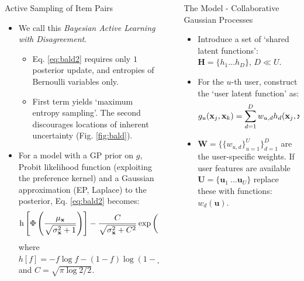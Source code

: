 \documentclass[final]{beamer}
\newlength{\sepwid}
\newlength{\onecolwid}
\newcommand{\x}{\mathbf{x}}
\begin{document}
\begin{frame}[t]
\begin{columns}[t]
\begin{column}{\onecolwid}
\begin{block}{Active Sampling of Item Pairs}
\begin{itemize}
\begin{align}
          \end{align}
        \item We call this \emph{Bayesian Active Learning with Disagreement}.
	  \begin{itemize}
            \normalsize       
	    \item Eq. \eqref{eq:bald2} requires only $1$ posterior update, and entropies of Bernoulli variables only.
            \item First term yields `maximum entropy sampling'. The second
                  discourages locations of inherent uncertainty (Fig. \ref{fig:bald}).
	  \end{itemize}        
	\item For a model with a GP prior on $g$, Probit likelihood function (exploiting the preference kernel)
              and a Gaussian approximation (EP, Laplace) to the posterior, Eq. \eqref{eq:bald2} becomes:
        \begin{equation}
        \mathrm{h} \left[ \Phi\left( \frac{\mu_{\x}}{\sqrt{\sigma^2_{\x} + 1}} \right)\right] -
        \frac{C}{\sqrt{\sigma_{\x}^2 + C^2}} \exp\left(\frac{-\mu_{\x}^2}{2\left(\sigma_{\x}^2 +
        C^2\right)}\right)\,.\notag
        \end{equation}
        where $h[f] = -f\log f - (1-f)\log(1-f)$ and $C=\sqrt{\pi\log 2 / 2}$.
      \end{itemize}
      \end{block}

    \end{column}

    \begin{column}{\sepwid}\end{column} %

    \begin{column}{\onecolwid}

      \begin{alertblock}{The Model - Collaborative Gaussian Processes}
        \begin{itemize}
          \item Introduce a set of `shared latent functions':
            $\mathbf{H} = \{h_1\ldots h_D\}$, $D \ll U$.
          \item For the $u$-th user, construct the `user latent function' as:
            \begin{equation}
              g_{u}(\mathbf{x}_j,\mathbf{x}_k)=\sum_{d=1}^{D}w_{u,d}h_{d}
                (\mathbf{x}_j,\mathbf{x}_k)\,.\notag
            \end{equation}
          \item $\mathbf{W} = \{\{w_{u, d}\}_{u=1}^U\}_{d=1}^D$ are the user-specific weights.
          If user features are available
            $\mathbf{U} = \{\mathbf{u}_1\ \ldots \mathbf{u}_U\}$ replace these with functions:
            $w_d(\mathbf{u})$.
        \end{itemize}
      \end{alertblock}


\end{column}
\end{columns}
\end{frame}
\end{document}
